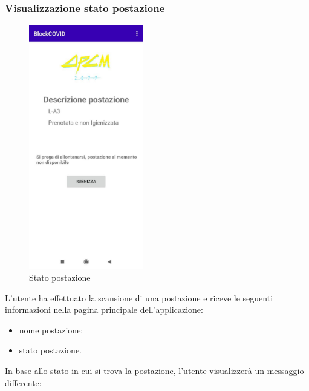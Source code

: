 	\subsubsection{Visualizzazione stato postazione}
	\begin{figure}[H]
		\centering
		\includegraphics[width=5cm]{res/images/prenotataENonIgienizzata.png}
		\caption{Stato postazione}
	\end{figure}
	L'utente ha effettuato la scansione di una postazione e riceve le seguenti informazioni nella pagina principale dell'applicazione:
	\begin{itemize}
		\item nome postazione;
		\item stato postazione.
	\end{itemize}
	In base allo stato in cui si trova la postazione, l'utente visualizzerà un messaggio differente:
